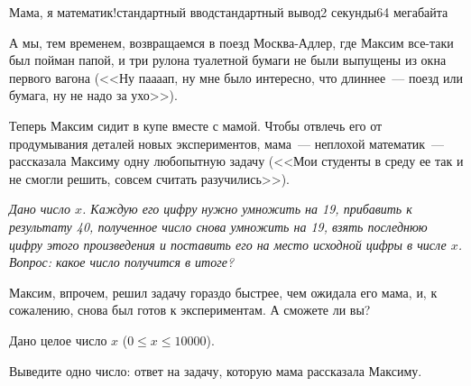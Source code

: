 \begin{problem}{Мама, я математик!}{стандартный ввод}{стандартный вывод}{2 секунды}{64 мегабайта}

А мы, тем временем, возвращаемся в поезд Москва-Адлер, где Максим все-таки был пойман папой, и три рулона туалетной бумаги не были выпущены из окна первого вагона (<<Ну паааап, ну мне было интересно, что длиннее~--- поезд или бумага, ну не надо за ухо>>). 

Теперь Максим сидит в купе вместе с мамой. Чтобы отвлечь его от продумывания деталей новых экспериментов, мама~--- неплохой математик~--- рассказала Максиму одну любопытную задачу (<<Мои студенты в среду ее так и не смогли решить, совсем считать разучились>>). 

\emph{Дано число $x$. Каждую его цифру нужно умножить на 19, прибавить к результату 40, полученное число снова умножить на 19, взять последнюю цифру этого произведения и поставить его на место исходной цифры в числе $x$. Вопрос: какое число получится в итоге?}

Максим, впрочем, решил задачу гораздо быстрее, чем ожидала его мама, и, к сожалению, снова был готов к экспериментам. А сможете ли вы?

\InputFile
Дано целое число $x$ ($0 \leqslant x \leqslant 10000$). 

\OutputFile
Выведите одно число: ответ на задачу, которую мама рассказала Максиму. 

\Examples

\begin{example}
%
\end{example}

\end{problem}
